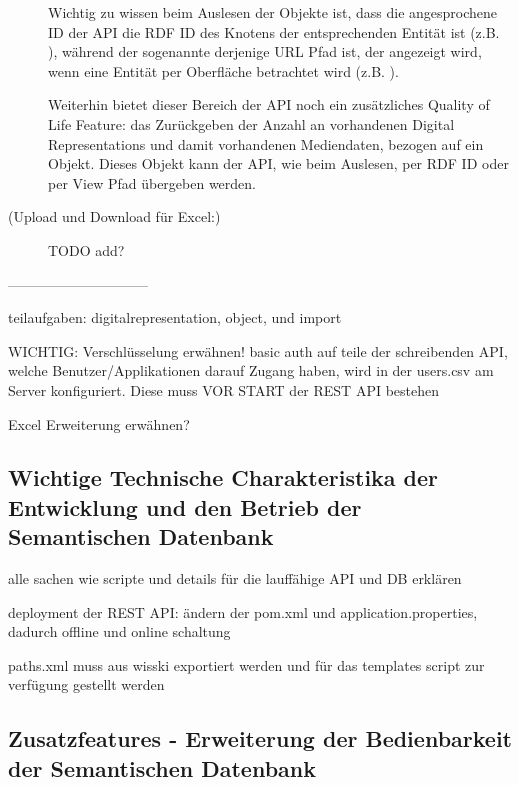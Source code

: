 \begin{description}
	Wichtig zu wissen beim Auslesen der Objekte ist, dass die angesprochene ID der API die RDF ID des Knotens der entsprechenden Entität ist (z.B. \texttt{}), während der sogenannte  derjenige URL Pfad ist, der angezeigt wird, wenn eine Entität per \wisski Oberfläche betrachtet wird (z.B. \texttt{}).
	
	Weiterhin bietet dieser Bereich der API noch ein zusätzliches Quality of Life Feature: das Zurückgeben der Anzahl an vorhandenen Digital Representations und damit vorhandenen Mediendaten, bezogen auf ein Objekt. Dieses Objekt kann der API, wie beim Auslesen, per RDF ID oder per \wisski View Pfad übergeben werden.
	
	\item[(Upload und Download für Excel:)] TODO add?
\end{description}

------------------------------

teilaufgaben: digitalrepresentation, object, und import

WICHTIG: Verschlüsselung erwähnen! basic auth auf teile der schreibenden API, welche Benutzer/Applikationen darauf Zugang haben, wird in der users.csv am Server konfiguriert. Diese muss VOR START der REST API bestehen

Excel Erweiterung erwähnen?

\subsection{Wichtige Technische Charakteristika der Entwicklung und den Betrieb der Semantischen Datenbank}\label{sec:features}

alle sachen wie scripte und details für die lauffähige API und DB erklären 

deployment der REST API: ändern der pom.xml und application.properties, dadurch offline und online schaltung

paths.xml muss aus wisski exportiert werden und für das templates script zur verfügung gestellt werden

\subsection{Zusatzfeatures - Erweiterung der Bedienbarkeit der Semantischen Datenbank}\label{sec:additional_features}

